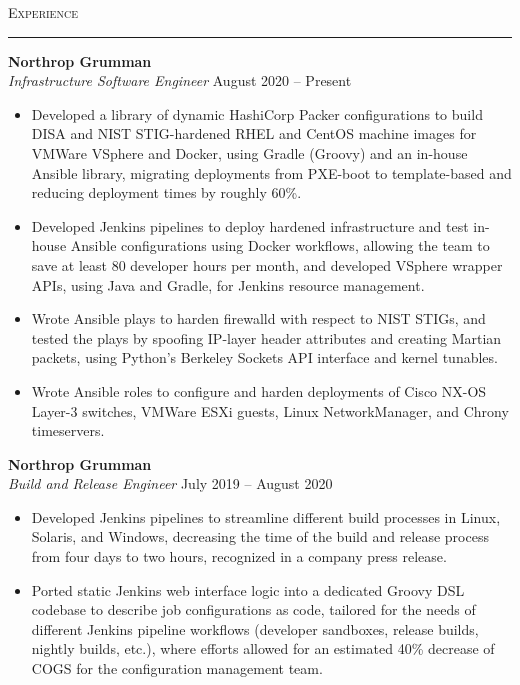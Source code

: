 \documentclass{res}
\begin{document}
\begin{resume}
\textsc{{\Large Experience}}
\vspace{0.5mm}
\hrule width18.5cm
\textbf{Northrop Grumman}\\
\textit{Infrastructure Software Engineer}
\hfill
August 2020 -- Present\\[1mm]
	\begin{itemize}
		\vspace{-3mm}
  \item Developed a library of dynamic HashiCorp Packer configurations to build DISA and NIST STIG-hardened RHEL and CentOS machine images for VMWare VSphere and Docker, using Gradle (Groovy) and an in-house Ansible library, migrating deployments from PXE-boot to template-based and reducing deployment times by roughly 60\%.
    \item Developed Jenkins pipelines to deploy hardened infrastructure and test in-house Ansible configurations using Docker workflows, allowing the team to save at least 80 developer hours per month, and developed VSphere wrapper APIs, using Java and Gradle, for Jenkins resource management.
    \item Wrote Ansible plays to harden firewalld with respect to NIST STIGs, and tested the plays by spoofing IP-layer header attributes and creating Martian packets, using Python's Berkeley Sockets API interface and kernel tunables.
    \item Wrote Ansible roles to configure and harden deployments of Cisco NX-OS Layer-3 switches, VMWare ESXi guests, Linux NetworkManager, and Chrony timeservers.
  \end{itemize}
\textbf{Northrop Grumman}\\
\textit{Build and Release Engineer}
\hfill
July 2019 -- August 2020\\[1mm]
	\begin{itemize}
		\vspace{-3mm}
    \item Developed Jenkins pipelines to streamline different build processes in Linux, Solaris, and Windows, decreasing the time of the build and release process from four days to two hours, recognized in a company press release.
    \item Ported static Jenkins web interface logic into a dedicated Groovy DSL codebase to describe job configurations as code, tailored for the needs of different Jenkins pipeline workflows (developer sandboxes, release builds, nightly builds, etc.), where efforts allowed for an estimated 40\% decrease of COGS for the configuration management team.

\end{itemize}
\end{resume}
\end{document}
